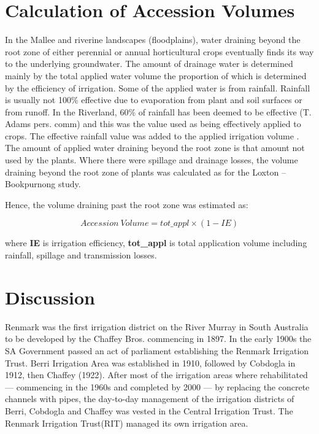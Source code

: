 \documentclass[a4paper, titlepage, 12pt]{article}\usepackage[]{graphicx}\usepackage[]{color}
\begin{document}
\begin{sffamily}
\section{Calculation of Accession Volumes}
In the Mallee and riverine landscapes (floodplains), water draining beyond the root zone of either perennial or annual horticultural crops eventually finds its way to the underlying groundwater. The amount of drainage water is determined mainly by the total applied water volume the proportion of which is determined by the efficiency of irrigation. Some of the applied water is from rainfall.  Rainfall is usually not 100\% effective due to evaporation from plant and soil surfaces \citep{Dastane} or from runoff.  In the Riverland, 60\% of rainfall has been deemed to be effective (T. Adams pers. comm) and this was the value used as being effectively applied to crops. The effective rainfall value was added to the applied irrigation volume \citep{Meissner2011b}.  The amount of applied water draining beyond the root zone is that amount not used by the plants.  Where there were spillage and drainage losses, the volume draining beyond the root zone of plants was calculated as for the Loxton -- Bookpurnong study\citep{Meissner2011a}.

Hence, the volume draining past the root zone was estimated as:

\begin{equation}  \label{eqn04} 
  Accession\ Volume = tot\_appl \times (1-IE)
\end{equation}

\noindent where \textbf{IE} is irrigation efficiency, \textbf{tot\_appl} is total application volume including rainfall, spillage and transmission losses. 


\section{Discussion}

Renmark was the first irrigation district on the River Murray in South Australia to be developed by the Chaffey Bros. commencing in 1897. In the early 1900s the SA Government passed an act of parliament establishing the Renmark Irrigation Trust. Berri Irrigation Area was established in 1910, followed by Cobdogla in 1912, then Chaffey (1922). After most of the irrigation areas where rehabilitated --- commencing in the 1960s and completed by 2000 --- by replacing the concrete channels with pipes, the day-to-day management of the irrigation districts of Berri, Cobdogla and Chaffey was vested in the Central Irrigation Trust. The Renmark Irrigation Trust(RIT) managed its own irrigation area. 


\end{sffamily}
\end{document}
